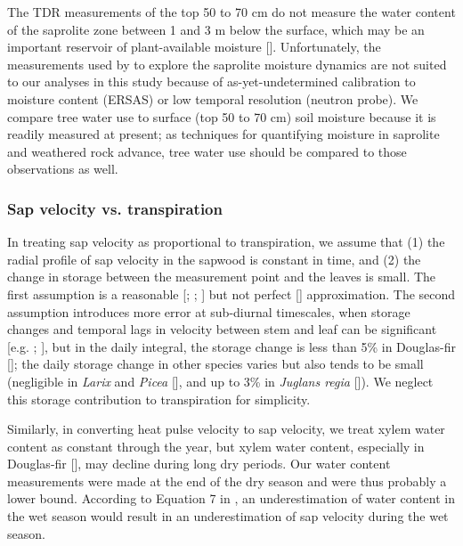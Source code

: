 The TDR measurements of the top 50 to 70 cm do not measure the water content of the saprolite zone between 1 and 3 m below the surface, which may be an important reservoir of plant-available moisture [\cite{salve2012rain}].  Unfortunately, the measurements used by \cite{salve2012rain} to explore the saprolite moisture dynamics are not suited to our analyses in this study because of as-yet-undetermined calibration to moisture content (ERSAS) or low temporal resolution (neutron probe).  We compare tree water use to surface (top 50 to 70 cm) soil moisture because it is readily measured at present; as techniques for quantifying moisture in saprolite and weathered rock advance, tree water use should be compared to those observations as well.

\subsubsection{Sap velocity vs. transpiration}
In treating sap velocity as proportional to transpiration, we assume that (1) the radial profile of sap velocity in the sapwood is constant in time, and (2) the change in storage between the measurement point and the leaves is small.  The first assumption is a reasonable [\cite{cohen1985determination}; \cite{nadezhdina2002radial}; \cite{dragoni2009decoupling}] but not perfect [\cite{ford2004assessing}] approximation.  The second assumption introduces more error at sub-diurnal timescales, when storage changes and temporal lags in velocity between stem and leaf can be significant [e.g. \cite{waring1978sapwood}; \cite{buckley2011nocturnal}], but in the daily integral, the storage change is less than 5\% in Douglas-fir [\cite{waring1978sapwood}]; the daily storage change in other species varies but also tends to be small (negligible in \textit{Larix} and \textit{Picea} [\cite{schulze}], and up to 3\% in \textit{Juglans regia} [\cite{constanz}]).  We neglect this storage contribution to transpiration for simplicity.

Similarly, in converting heat pulse velocity to sap velocity, we treat xylem water content as constant through the year, but xylem water content, especially in Douglas-fir [\cite{waring1978sapwood}], may decline during long dry periods.  Our water content measurements were made at the end of the dry season and were thus probably a lower bound.  According to Equation 7 in \cite{burgess2001improved}, an underestimation of water content in the wet season would result in an underestimation of sap velocity during the wet season.

